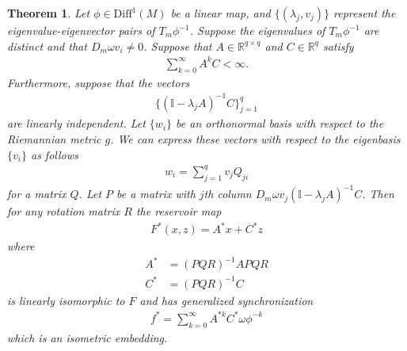 \documentclass{article}
\newtheorem{theorem}{Theorem}
\theoremstyle{definition}
\theoremstyle{definition}
\numberwithin{theorem}{section}
\begin{document}
\begin{theorem}
Let $\phi \in \text{Diff}^1(M)$ be a linear map, and $\{ (\lambda_j, v_j) \}$ represent the eigenvalue-eigenvector pairs of $T_m \phi^{-1}$. Suppose the eigenvalues of $T_m\phi^{-1}$ are distinct and that $D_m\omega v_i \neq 0$. Suppose that $A \in \mathbb{R}^{q\times q}$ and $C \in \mathbb{R}^q$ satisfy
\begin{align*}
    \sum_{k=0}^{\infty} A^k C < \infty.
\end{align*}
Furthermore, suppose that the vectors
\begin{align*}
    \{(\mathbb{I} - \lambda_j A)^{-1}C\}_{j = 1}^q
\end{align*}
are linearly independent.
Let $\{ w_i \}$ be an orthonormal basis with respect to the Riemannian metric $g$. We can express these vectors with respect to the eigenbasis $\{v_i\}$ as follows
\begin{align*}
    w_i = \sum_{j=1}^q v_j Q_{ji}
\end{align*}
for a matrix $Q$.
Let $P$ be a matrix with $j$th column $D_m\omega v_j (\mathbb{I} - \lambda_j A)^{-1}C$. Then for any rotation matrix $R$ the reservoir map
\begin{align*}
    F^*(x,z) = A^* x + C^* z
\end{align*}
where
\begin{align*}
    A^* &= (PQR)^{-1} A P Q R \\
    C^* &= (PQR)^{-1} C
\end{align*}
is linearly isomorphic to $F$ and has generalized synchronization
\begin{align*}
    f^* = \sum_{k=0}^{\infty} A^{*k} C^* \omega\phi^{-k}
\end{align*}
    which is an isometric embedding.
\end{theorem}
\end{document}
